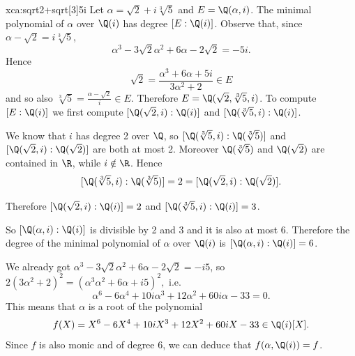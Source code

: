 \begin{sol}{xca:sqrt{2}+sqrt[3]{5}i}
    Let $\alpha=\sqrt{2}+i\sqrt[3]{5}$ and $E=\Q(\alpha,i)$. 
    The minimal polynomial of $\alpha$ over $\Q(i)$ has
    degree $[E:\Q(i)]$.
    Observe that, since $\alpha-\sqrt{2}=i\sqrt[3]{5}$,
    \[
    \alpha^3-3\sqrt{2}\alpha^2+6\alpha-2\sqrt{2}=-5i.
    \]
    Hence 
    \[
    \sqrt{2}=\frac{\alpha^3+6\alpha+5i}{3\alpha^2+2}\in E
    \]
    and so also $\sqrt[3]{5}=\frac{\alpha-\sqrt{2}}{i}\in E$. 
    Therefore $E=\Q(\sqrt{2},\sqrt[3]{5},i)$.
    To compute $[E:\Q(i)]$ we first compute $[\Q(\sqrt{2},i):\Q(i)]$
    and  $[\Q(\sqrt[3]{5},i):\Q(i)]$.
    
    We know that $i$ has degree 2 over $\Q$,
so $[\Q(\sqrt[3]{5},i):\Q(\sqrt[3]{5})]$ and 
$[\Q(\sqrt{2},i):\Q(\sqrt{2})]$ are both at most 2.
Moreover $\Q(\sqrt[3]{5})$ and $\Q(\sqrt{2})$ are contained in $\R$,
while $i\notin\R$.
Hence
\[
[\Q(\sqrt[3]{5},i):\Q(\sqrt[3]{5})]=2=[\Q(\sqrt{2},i):\Q(\sqrt{2})].
\]
\begin{center}
    \end{center}
Therefore $[\Q(\sqrt{2},i):\Q(i)]=2$
    and  $[\Q(\sqrt[3]{5},i):\Q(i)]=3$.
    \begin{center}
    \end{center}
So $[\Q(\alpha, i):\Q(i)]$ is divisible by 2 and 3 and it is also at most 6.
Therefore the degree of the minimal polynomial
of $\alpha$ over $\Q(i)$ is $[\Q(\alpha,i):\Q(i)]=6$.

We already got $\alpha^3-3\sqrt{2}\alpha^2+6\alpha-2\sqrt{2}=-i5$, 
so $2(3\alpha^2+2)^2=(\alpha^3\alpha^2+6\alpha+i5)^2,
$
i.e. 
\[
\alpha^6-6\alpha^4+10i\alpha^3+12\alpha^2+60i\alpha-33=0.
\]
This means that $\alpha$ is a root of the polynomial
\[
f(X)=X^6-6X^4+10iX^3+12X^2+60iX-33\in\Q(i)[X].
\]
Since $f$ is also monic and of degree 6, we can deduce that 
$f(\alpha,\Q(i))=f$.
\end{sol}

